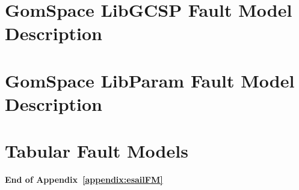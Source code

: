 \documentclass[11pt,twoside]{book}
\begin{document}


\section{GomSpace LibGCSP Fault Model Description}



\section{GomSpace LibParam Fault Model Description}



\section{Tabular Fault Models}



\textbf{End of Appendix~\ref{appendix:esailFM}}

   
\clearpage
%
\clearpage

\printindex



\end{document}
